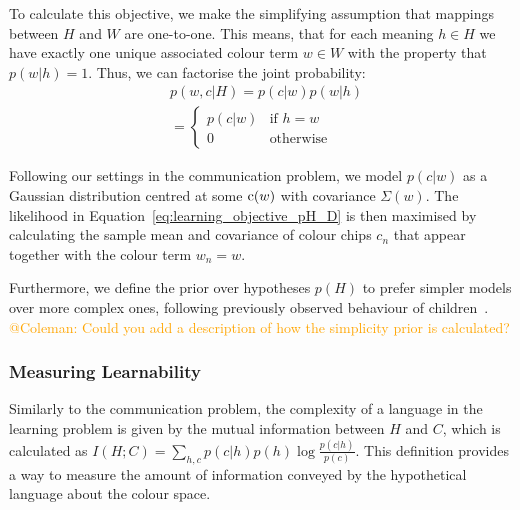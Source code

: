 \documentclass[11pt]{article}
\begin{document}
To calculate this objective, we make the simplifying assumption that mappings between $H$ and $W$ are one-to-one. This means, that for each meaning $h \in H$ we have exactly one unique associated colour term $w \in W$ with the property that $p(w|h)=1$. Thus, we can factorise the joint probability:
\begin{equation}
    \begin{aligned}
     & p(w, c|H) = p(c|w)p(w|h) \\
     & =
        \begin{cases}
            p(c|w) & \text{if $h=w$}\\
            0 & \text{otherwise}
        \end{cases} 
    \end{aligned}
    \label{eq:factorise_data_pair}
\end{equation}

Following our settings in the communication problem, we model $p(c|w)$ as a Gaussian distribution centred at some ${\textnormal{c}}(w)$ with covariance $\Sigma(w)$. The likelihood in Equation~\ref{eq:learning_objective_pH_D} is then maximised by calculating the sample mean and covariance of colour chips $c_n$ that appear together with the colour term $w_n=w$.

Furthermore, we define the prior over hypotheses $p(H)$ to prefer simpler models over more complex ones, following previously observed behaviour of children~\cite{todo}. \textcolor{orange}{@Coleman: Could you add a description of how the simplicity prior is calculated?}



\subsubsection{Measuring Learnability}\label{sssec:learnability}
Similarly to the communication problem, the complexity of a language in the learning problem is given by the mutual information between $H$ and $C$, which is calculated as $ I(H;C) = \sum_{h,c} p(c|h)p(h)\log\frac{p(c|h)}{p(c)}$. This definition provides a way to measure the amount of information conveyed by the hypothetical language about the colour space. %

\end{document}
